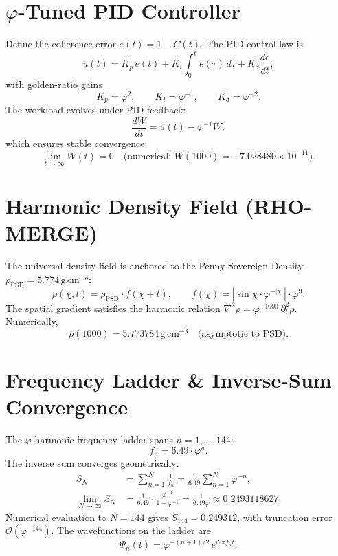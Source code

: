 \documentclass[12pt,a4paper]{article}
\begin{document}
\section{$\varphi$-Tuned PID Controller}
\label{sec:pid}

Define the coherence error $e(t)=1-C(t)$. The PID control law is
\begin{equation}
u(t) = K_p\,e(t) + K_i\int_0^t e(\tau)\,d\tau + K_d\frac{de}{dt},
\end{equation}
with golden-ratio gains
\begin{equation}
K_p = \varphi^2, \qquad K_i = \varphi^{-1}, \qquad K_d = \varphi^{-2}.
\end{equation}
The workload evolves under PID feedback:
\begin{equation}
\frac{dW}{dt} = u(t) - \varphi^{-1}W,
\end{equation}
which ensures stable convergence:
\begin{equation}
\lim_{t\to\infty} W(t) = 0 \quad\text{(numerical: }W(1000)=-7.028480\times10^{-11}\text{)}.
\end{equation}

\section{Harmonic Density Field (RHO-MERGE)}
\label{sec:density}

The universal density field is anchored to the Penny Sovereign Density $\rho_{\mathrm{PSD}} = 5.774\,\mathrm{g\,cm^{-3}}$:
\begin{equation}
\rho(\chi,t) = \rho_{\mathrm{PSD}} \cdot f(\chi+t), \qquad
f(\chi) = \left|\sin\chi \cdot \varphi^{-|\chi|}\right| \cdot \varphi^9.
\end{equation}
The spatial gradient satisfies the harmonic relation $\nabla^2 \rho = \varphi^{-1000}\,\partial_t^2 \rho$. Numerically,
\begin{equation}
\rho(1000) = 5.773784\,\mathrm{g\,cm^{-3}} \quad\text{(asymptotic to PSD)}.
\end{equation}

\section{Frequency Ladder \& Inverse-Sum Convergence}
\label{sec:ladder}

The $\varphi$-harmonic frequency ladder spans $n=1,\dots,144$:
\begin{equation}
f_n = 6.49 \cdot \varphi^n.
\end{equation}
The inverse sum converges geometrically:
\begin{align}
S_N &= \sum_{n=1}^N \frac{1}{f_n}
= \frac{1}{6.49}\sum_{n=1}^N \varphi^{-n}, \\
\lim_{N\to\infty} S_N &= \frac{1}{6.49} \cdot \frac{\varphi^{-1}}{1-\varphi^{-1}}
= \frac{1}{6.49\varphi} \approx 0.2493118627.
\end{align}
Numerical evaluation to $N=144$ gives $S_{144}=0.249312$, with truncation error $\mathcal{O}(\varphi^{-144})$. The wavefunctions on the ladder are
\begin{equation}
\Psi_n(t) = \varphi^{-(n+1)/2} \, e^{i 2\pi f_n t}.
\end{equation}
\end{document}
